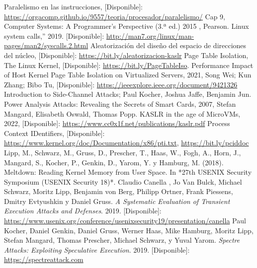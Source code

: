 \documentclass[lettersize,compsoc]{IEEEtran}
\begin{document}
\begin{thebibliography}{9}


 Paralelismo en las instrucciones, [Disponible]: \url{https://orgacomp.github.io/9557/teoria/procesador/paralelismo/}
 Cap 9, Computer Systems: A Programmer’s Perspective (3.ª ed.) 2015 , Pearson.
  Linux system calls,” 2019. [Disponible]: \url{http://man7.org/linux/man-pages/man2/syscalls.2.html} 
 Aleatorización del diseño del espacio de direcciones del núcleo, [Disponible]: \url{https://bit.ly/aleatorizacion-kaslr}
 Page Table Isolation, The Linux Kernel, [Disponible]: \url{https://bit.ly/PageTableIso}.
 Performance Impact of Host Kernel Page Table Isolation on Virtualized Servers, 2021, Song Wei; Kun Zhang; Bibo Tu, [Disponible]: \url{https://ieeexplore.ieee.org/document/9421326}
 Introduction to Side-Channel Attacks; Paul Kocher, Joshua Jaffe, Benjamin Jun.
 Power Analysis Attacks: Revealing the Secrets of Smart Cards, 2007,  Stefan Mangard, Elisabeth Oswald, Thomas Popp.
 KASLR in the age of MicroVMs, 2022, [Disponible]: \url{https://www.cc0x1f.net/publications/kaslr.pdf}
 Process Context IDentifiers, [Disponible]: \url{https://www.kernel.org/doc/Documentation/x86/pti.txt}, \url{https://bit.ly/pciddoc}
 Lipp, M., Schwarz, M., Gruss, D., Prescher, T., Haas, W., Fogh, A., Horn, J., Mangard, S., Kocher, P., Genkin, D., Yarom, Y. y Hamburg, M. (2018). Meltdown: Reading Kernel Memory from User Space. In *27th USENIX Security Symposium (USENIX Security 18)*.
 Claudio Canella , Jo Van Bulck, Michael Schwarz, Moritz Lipp, Benjamin von Berg, Philipp Ortner, Frank Piessens, Dmitry Evtyushkin y Daniel Gruss. \textit{A Systematic Evaluation of Transient Execution Attacks and Defenses}. 2019. [Disponible]: \url{https://www.usenix.org/conference/usenixsecurity19/presentation/canella}
 Paul Kocher, Daniel Genkin, Daniel Gruss, Werner Haas, Mike Hamburg, Moritz Lipp, Stefan Mangard, Thomas Prescher, Michael Schwarz, y Yuval Yarom. \textit{Spectre Attacks: Exploiting Speculative Execution}. 2019. [Disponible]: \url{https://spectreattack.com}

\end{thebibliography}
\end{document}
